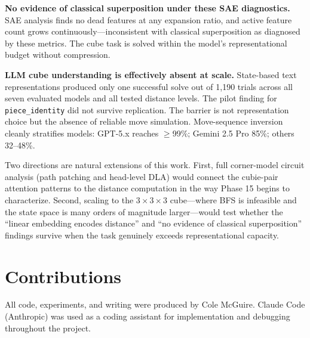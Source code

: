 \documentclass[12pt]{article}
\begin{document}
\textbf{No evidence of classical superposition under these SAE diagnostics.}
SAE analysis finds no dead features at any expansion ratio, and active feature
count grows continuously---inconsistent with classical superposition as diagnosed
by these metrics.  The cube task is solved within the model's representational
budget without compression.

\textbf{LLM cube understanding is effectively absent at scale.}  State-based text
representations produced only one successful solve out of 1,190 trials across all
seven evaluated models and all tested distance levels.
The pilot finding for \texttt{piece\_identity} did not survive replication.  The
barrier is not representation choice but the absence of reliable move simulation.
Move-sequence inversion cleanly stratifies models: GPT-5.x reaches $\geq$99\%;
Gemini 2.5 Pro 85\%; others 32--48\%.

Two directions are natural extensions of this work.  First, full corner-model
circuit analysis (path patching and head-level DLA) would connect the cubie-pair
attention patterns to the distance computation in the way Phase 15 begins to
characterize.  Second, scaling to the $3{\times}3{\times}3$ cube---where BFS is
infeasible and the state space is many orders of magnitude larger---would test
whether the ``linear embedding encodes distance'' and ``no evidence of classical
superposition'' findings survive when the task genuinely exceeds representational
capacity.

\section*{Contributions}

All code, experiments, and writing were produced by Cole McGuire.  Claude Code
(Anthropic) was used as a coding assistant for implementation and debugging
throughout the project.



\end{document}
